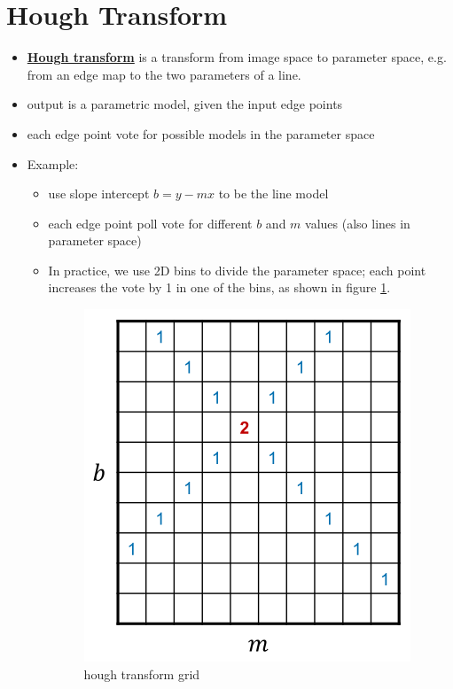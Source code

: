 \documentclass[twocolumn,landscape,10pt]{article}
\theoremstyle{definition}
\begin{document}
\section{Hough Transform}

\begin{itemize}
    \item \underline{\textbf{Hough transform}} is a transform from image space
        to parameter space, e.g. from an edge map to the two parameters of a
        line.
    \item output is a parametric model, given the input edge points
    \item each edge point vote for possible models in the parameter space
    \item Example:
        \begin{itemize}
            \item use slope intercept $b=y-mx$ to be the line model
            \item each edge point poll vote for different $b$ and $m$ values
                (also lines in parameter space)
            \item In practice, we use 2D bins to divide the parameter space;
                each point increases the vote by 1 in one of the bins,
                as shown in figure \ref{fig:hough_grid}.
                \begin{figure}
                  	\includegraphics[scale=0.45]{hough_grid.png}
                  	\centering
                  	\caption{hough transform grid}\label{fig:hough_grid}
                \end{figure}

\end{itemize}
\end{itemize}
\end{document}
